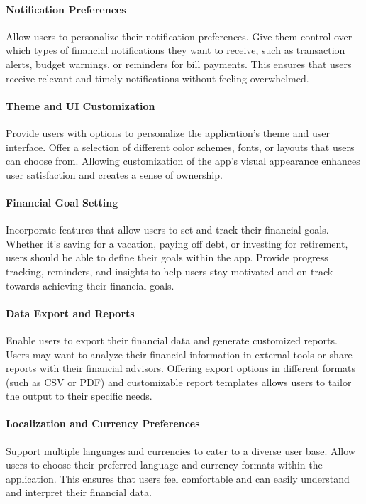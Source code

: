 \paragraph{Notification Preferences}
Allow users to personalize their notification preferences. Give them control over which types of financial 
notifications they want to receive, such as transaction alerts, budget warnings, or reminders for bill payments. 
This ensures that users receive relevant and timely notifications without feeling overwhelmed.

\paragraph{Theme and UI Customization}
Provide users with options to personalize the application's theme and user interface. Offer a selection of different 
color schemes, fonts, or layouts that users can choose from. Allowing customization of the app's visual appearance 
enhances user satisfaction and creates a sense of ownership.

\paragraph{Financial Goal Setting}
Incorporate features that allow users to set and track their financial goals. Whether it's saving for a 
vacation, paying off debt, or investing for retirement, users should be able to define their goals within 
the app. Provide progress tracking, reminders, and insights to help users stay motivated and on track towards 
achieving their financial goals.

\paragraph{Data Export and Reports}
Enable users to export their financial data and generate customized reports. Users may want to analyze their 
financial information in external tools or share reports with their financial advisors. Offering export options 
in different formats (such as CSV or PDF) and customizable report templates allows users to tailor the output to 
their specific needs.

\paragraph{Localization and Currency Preferences}
Support multiple languages and currencies to cater to a diverse user base. Allow users to choose their preferred 
language and currency formats within the application. This ensures that users feel comfortable and can easily 
understand and interpret their financial data.

